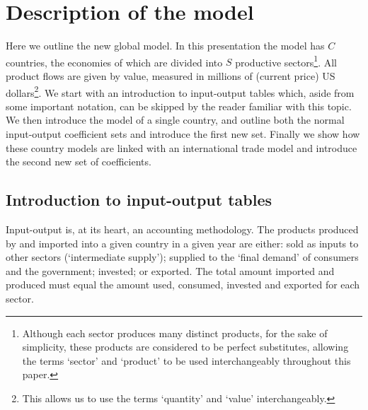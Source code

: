 \documentclass[a4paper]{article}
\begin{document}
\section{Description of the model} \label{sec:system}
Here we outline the new global model.
In this presentation the model has $C$ countries, the economies of which are divided into $S$ productive sectors\footnote{Although each sector produces many distinct products, for the sake of simplicity, these products are considered to be perfect substitutes, allowing the terms `sector' and `product' to be used interchangeably throughout this paper.}.
All product flows are given by value, measured in millions of (current price) US dollars\footnote{This allows us to use the terms `quantity' and `value' interchangeably.}.
We start with an introduction to input-output tables which, aside from some important notation, can be skipped by the reader familiar with this topic.
We then introduce the model of a single country, and outline both the normal input-output coefficient sets and introduce the first new set.
Finally we show how these country models are linked with an international trade model and introduce the second new set of coefficients.

\subsection{Introduction to input-output tables} \label{sec:iots}
Input-output is, at its heart, an accounting methodology.
The products produced by and imported into a given country in a given year are either: sold as inputs to other sectors (`intermediate supply'); supplied to the `final demand' of consumers and the government; invested; or exported.
The total amount imported and produced must equal the amount used, consumed, invested and exported for each sector.
\end{document}
